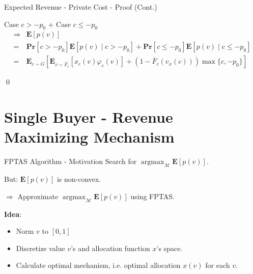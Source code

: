 \documentclass{beamer}
\begin{document}
\begin{frame}{Expected Revenue - Private Cost - Proof (Cont.)}

  Case $c > -p_0$ + Case $c \leq -p_0$
  \begin{align*}
    \Rightarrow & \mathbf{E}\left[p(v)\right]                                                                                                            \\
    =           & \mathbf{Pr}[c > -p_0]\mathbf{E}\left[p(v) \mid c > -p_0\right] + \mathbf{Pr}[c \leq -p_0]\mathbf{E}\left[p(v) \mid c \leq -p_0\right]  \\
    =           & \mathbf{E}_{c \sim G}\left[\mathbf{E}_{v \sim \bar{F}_c}\left[x_c(v)\varphi_c(v)\right] + (1-\bar{F}_c(v_x(c))) \max\{c, -p_0\}\right]
  \end{align*}

  \qed
\end{frame}

\section{Single Buyer - Revenue Maximizing Mechanism}

\begin{frame}{FPTAS Algorithm - Motivation}
  Search for $\operatorname{argmax}_{\mathcal{M}} \mathbf{E}\left[p(v)\right]$.

  But: $\mathbf{E}\left[p(v)\right]$ is non-convex.

  $\Rightarrow$ Approximate $\operatorname{argmax}_{\mathcal{M}} \mathbf{E}\left[p(v)\right]$ using FPTAS.

  \textbf{Idea}:
  \begin{itemize}
    \item Norm $v$ to $[0,1]$
    \item Discretize value $v$'s and allocation function $x$'s space.
    \item Calculate optimal mechanism, i.e. optimal allocation $x(v)$ for each $v$.
  \end{itemize}

\end{frame}
\end{document}
